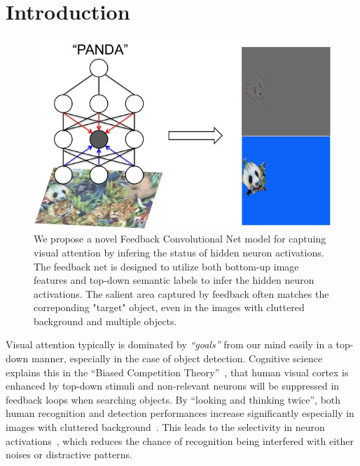 \section{Introduction}

\begin{center}
\end{center}

\setlength{\tabcolsep}{2pt}
\begin{figure}[htb]
\begin{center}
\includegraphics[width=0.95\columnwidth]{figs/splash/splash}
\caption{We propose a novel Feedback Convolutional Net model for captuing visual attention by infering the status of hidden neuron activations. The feedback net is designed to utilize both bottom-up image features and top-down semantic labels to infer the hidden neuron activations. The salient area captured by feedback often matches the correponding "target" object, even in the images with cluttered background and multiple objects.}
\label{fig:splash0}
\vspace{-10pt}
\end{center}
\end{figure}

Visual attention typically is dominated by \emph{``goals''} from our mind easily in a top-down manner, especially in the case of object detection. Cognitive science explains this in the ``Biased Competition Theory''~\cite{beck2009top,desimone1998visual,desimone1995neural}, that human visual cortex is enhanced by top-down stimuli and non-relevant neurons will be suppressed in feedback loops when searching objects. By ``looking and thinking twice'', both human recognition and detection performances increase significantly especially in images with cluttered background~\cite{Cichy2014Resolving}. This leads to the selectivity in neuron activations~\cite{Kruger2013Deep}, which reduces the chance of recognition being interfered with either noises or distractive patterns.

